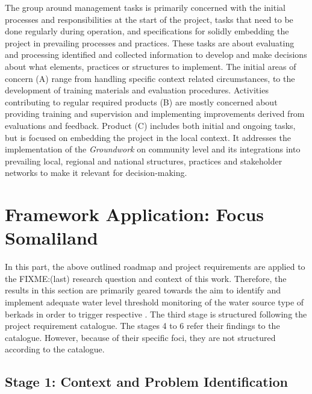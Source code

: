 The group around management tasks is primarily concerned with the initial processes and responsibilities at the start of the project, tasks that need to be done regularly during operation, and specifications for solidly embedding the project in prevailing processes and practices. These tasks are about evaluating and processing identified and collected information to develop and make decisions about what elements, practices or structures to implement. The initial areas of concern (A) range from handling specific context related circumstances, to the development of training materials and evaluation procedures. Activities contributing to regular required products (B) are mostly concerned about providing training and supervision and implementing improvements derived from evaluations and feedback. Product (C) includes both initial and ongoing tasks, but is focused on embedding the project in the local context. It addresses the implementation of the \textit{Groundwork} on community level and its integrations into prevailing local, regional and national structures, practices and stakeholder networks to make it relevant for decision-making.



\section{Framework Application: Focus Somaliland}

In this part, the above outlined roadmap and project requirements are applied to the FIXME:(last) research question and context of this work. Therefore, the results in this section are primarily geared towards the aim to identify and implement adequate water level threshold monitoring of the water source type of berkads in order to trigger respective . The third stage is structured following the project requirement catalogue. The stages 4 to 6 refer their findings to the catalogue. However, because of their specific foci, they are not structured according to the catalogue.

\subsection{Stage 1: Context and Problem Identification}\label{subsec:stage1_appl}

